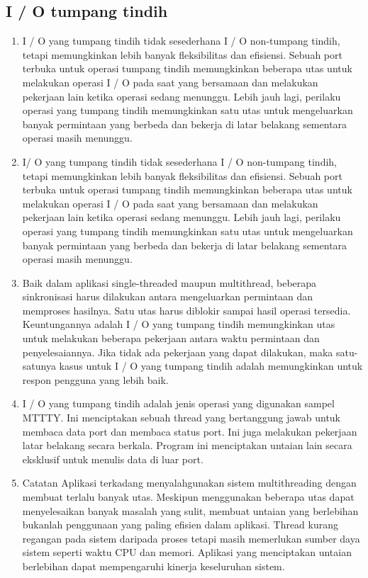 		\subsection{I / O tumpang tindih}
		\begin{enumerate}
		

				\item I / O yang tumpang tindih tidak sesederhana I / O non-tumpang tindih, tetapi memungkinkan lebih banyak fleksibilitas dan efisiensi. Sebuah port terbuka untuk operasi tumpang tindih memungkinkan beberapa utas untuk melakukan operasi I / O pada saat yang bersamaan dan melakukan pekerjaan lain ketika operasi sedang menunggu. Lebih jauh lagi, perilaku operasi yang tumpang tindih memungkinkan satu utas untuk mengeluarkan banyak permintaan yang berbeda dan bekerja di latar belakang sementara operasi masih menunggu.

				\item I/ O yang tumpang tindih tidak sesederhana I / O non-tumpang tindih, tetapi memungkinkan lebih banyak fleksibilitas dan efisiensi. Sebuah port terbuka untuk operasi tumpang tindih memungkinkan beberapa utas untuk melakukan operasi I / O pada saat yang bersamaan dan melakukan pekerjaan lain ketika operasi sedang menunggu. Lebih jauh lagi, perilaku operasi yang tumpang tindih memungkinkan satu utas untuk mengeluarkan banyak permintaan yang berbeda dan bekerja di latar belakang sementara operasi masih menunggu.


				\item Baik dalam aplikasi single-threaded maupun multithread, beberapa sinkronisasi harus dilakukan antara mengeluarkan permintaan dan memproses hasilnya. Satu utas harus diblokir sampai hasil operasi tersedia. Keuntungannya adalah I / O yang tumpang tindih memungkinkan utas untuk melakukan beberapa pekerjaan antara waktu permintaan dan penyelesaiannya. Jika tidak ada pekerjaan yang dapat dilakukan, maka satu-satunya kasus untuk I / O yang tumpang tindih adalah memungkinkan untuk respon pengguna yang lebih baik.

				\item I / O yang tumpang tindih adalah jenis operasi yang digunakan sampel MTTTY. Ini menciptakan sebuah thread yang bertanggung jawab untuk membaca data port dan membaca status port. Ini juga melakukan pekerjaan latar belakang secara berkala. Program ini menciptakan untaian lain secara eksklusif untuk menulis data di luar port.
				
				\item Catatan Aplikasi terkadang menyalahgunakan sistem multithreading dengan membuat terlalu banyak utas. Meskipun menggunakan beberapa utas dapat menyelesaikan banyak masalah yang sulit, membuat untaian yang berlebihan bukanlah penggunaan yang paling efisien dalam aplikasi. Thread kurang regangan pada sistem daripada proses tetapi masih memerlukan sumber daya sistem seperti waktu CPU dan memori. Aplikasi yang menciptakan untaian berlebihan dapat mempengaruhi kinerja keseluruhan sistem.

		\end{enumerate}

